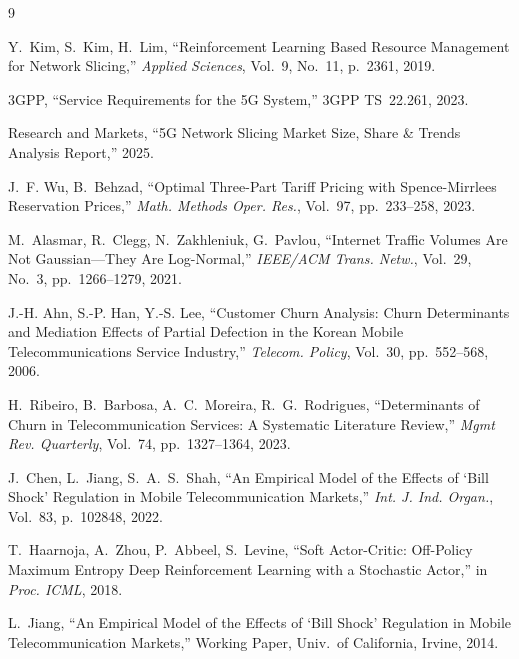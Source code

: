 \documentclass[10pt, twocolumn]{article}
\begin{document}
\begin{thebibliography}{9}

Y.~Kim, S.~Kim, H.~Lim, ``Reinforcement Learning Based Resource Management for Network Slicing,'' \textit{Applied Sciences}, Vol.~9, No.~11, p.~2361, 2019.

3GPP, ``Service Requirements for the 5G System,'' 3GPP TS~22.261, 2023.

Research and Markets, ``5G Network Slicing Market Size, Share \& Trends Analysis Report,'' 2025.

J.~F. Wu, B.~Behzad, ``Optimal Three-Part Tariff Pricing with Spence-Mirrlees Reservation Prices,'' \textit{Math. Methods Oper. Res.}, Vol.~97, pp.~233--258, 2023.

M.~Alasmar, R.~Clegg, N.~Zakhleniuk, G.~Pavlou, ``Internet Traffic Volumes Are Not Gaussian---They Are Log-Normal,'' \textit{IEEE/ACM Trans. Netw.}, Vol.~29, No.~3, pp.~1266--1279, 2021.

J.-H. Ahn, S.-P. Han, Y.-S. Lee, ``Customer Churn Analysis: Churn Determinants and Mediation Effects of Partial Defection in the Korean Mobile Telecommunications Service Industry,'' \textit{Telecom. Policy}, Vol.~30, pp.~552--568, 2006.

H.~Ribeiro, B.~Barbosa, A.~C.~Moreira, R.~G.~Rodrigues, ``Determinants of Churn in Telecommunication Services: A Systematic Literature Review,'' \textit{Mgmt Rev. Quarterly}, Vol.~74, pp.~1327--1364, 2023.

J.~Chen, L.~Jiang, S.~A.~S.~Shah, ``An Empirical Model of the Effects of `Bill Shock' Regulation in Mobile Telecommunication Markets,'' \textit{Int. J. Ind. Organ.}, Vol.~83, p.~102848, 2022.

T.~Haarnoja, A.~Zhou, P.~Abbeel, S.~Levine, ``Soft Actor-Critic: Off-Policy Maximum Entropy Deep Reinforcement Learning with a Stochastic Actor,'' in \textit{Proc. ICML}, 2018.

L.~Jiang, ``An Empirical Model of the Effects of `Bill Shock' Regulation in Mobile Telecommunication Markets,'' Working Paper, Univ.\ of California, Irvine, 2014.

\end{thebibliography}
\end{document}

